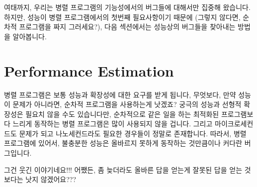 여태까지, 우리는 병렬 프로그램의 기능성에서의 버그들에 대해서만 집중해
왔습니다.
하지만, 성능이 병렬 프로그램에서의 첫번째 필요사항이기 때문에 (그렇지 않다면,
순차적 프로그램을 짜지 그러세요?), 다음 섹션에서는 성능상의 버그들을 찾아내는
방법을 알아봅니다.

\section{Performance Estimation}
\label{sec:debugging:Performance Estimation}

병렬 프로그램은 보통 성능과 확장성에 대한 요구를 받게 됩니다, 무엇보다, 만약
성능이 문제가 아니라면, 순차적 프로그램을 사용하는게 낫겠죠?
궁극의 성능과 선형적 확장성은 필요치 않을 수도 있습니다만, 순차적으로 같은 일을
하는 최적화된 프로그램보다 느리게 동작하는 병렬 프로그램은 많이 사용되지 않을
겁니다.
그리고 마이크로세컨드도 문제가 되고 나노세컨드라도 필요한 경우들이 정말로
존재합니다.
따라서, 병렬 프로그램에 있어서, 불충분한 성능은 올바르지 못하게 동작하는
것만큼이나 커다란 버그입니다.

\QuickQuiz{}
	그건 웃긴 이야기네요!!!
	어쨌든, 좀 늦더라도 올바른 답을 얻는게 잘못된 답을 얻는 것보다는 낫지
	않겠어요???
	\iffalse

